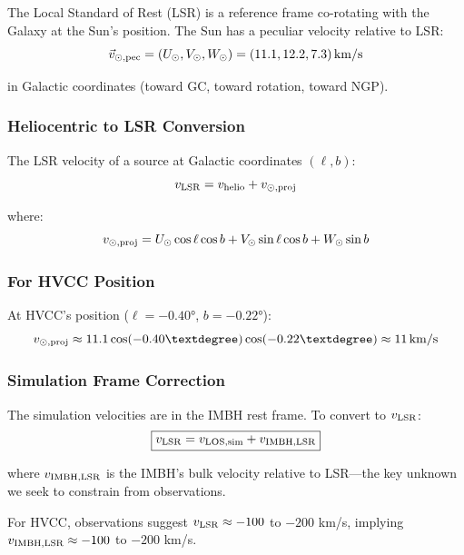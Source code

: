 \documentclass[twocolumn,amsmath,amssymb,prd,superscriptaddress,nofootinbib]{revtex4-2}
\begin{document}
The Local Standard of Rest (LSR) is a reference frame co-rotating with the Galaxy at the Sun's position. The Sun has a peculiar velocity relative to LSR:
\begin{equation}
    \vec{v}_{\odot,{\rm pec}} = (U_\odot, V_\odot, W_\odot) = (11.1, 12.2, 7.3)\,{\rm km/s}
\end{equation}

in Galactic coordinates (toward GC, toward rotation, toward NGP).

\subsubsection{Heliocentric to LSR Conversion}

The LSR velocity of a source at Galactic coordinates $(\ell, b)$:
\begin{equation}
    v_{\rm LSR} = v_{\rm helio} + v_{\odot,{\rm proj}}
\end{equation}

where:
\begin{equation}
    v_{\odot,{\rm proj}} = U_\odot\cos\ell\cos b + V_\odot\sin\ell\cos b + W_\odot\sin b
    \label{eq:v_sun_proj}
\end{equation}

\subsubsection{For HVCC Position}

At HVCC's position ($\ell = -0.40°$, $b = -0.22°$):
\begin{equation}
    v_{\odot,{\rm proj}} \approx 11.1\cos(-0.40°)\cos(-0.22°) \approx 11\,{\rm km/s}
\end{equation}

\subsubsection{Simulation Frame Correction}

The simulation velocities are in the IMBH rest frame. To convert to $v_{\rm LSR}$:
\begin{equation}
    \boxed{v_{\rm LSR} = v_{\rm LOS,sim} + v_{\rm IMBH,LSR}}
    \label{eq:v_lsr}
\end{equation}

where $v_{\rm IMBH,LSR}$ is the IMBH's bulk velocity relative to LSR---the key unknown we seek to constrain from observations.

For HVCC, observations suggest $v_{\rm LSR} \approx -100$ to $-200$ km/s, implying $v_{\rm IMBH,LSR} \approx -100$ to $-200$ km/s.
\end{document}
